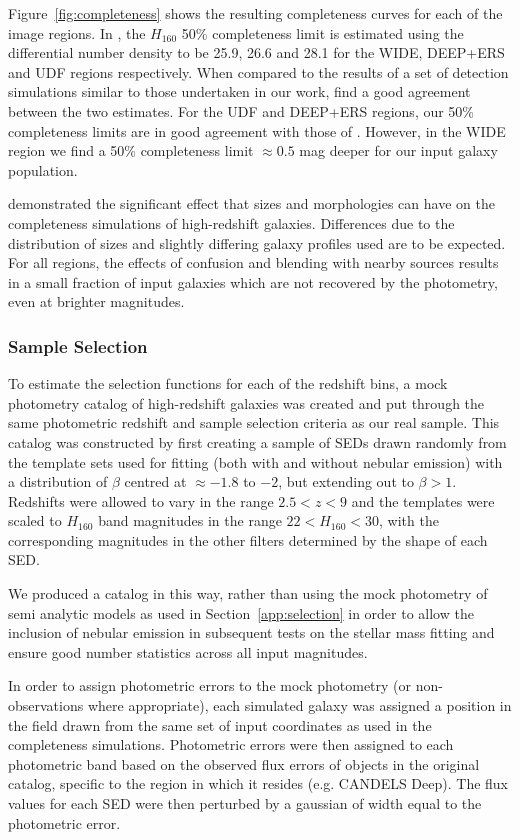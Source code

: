 Figure~\ref{fig:completeness} shows the resulting completeness curves for each of the image regions. In \citet{Guo:2013ig}, the $H_{160}$ 50\% completeness limit is estimated using the differential number density to be 25.9, 26.6 and 28.1 for the WIDE, DEEP+ERS and UDF regions respectively. When compared to the results of a set of detection simulations similar to those undertaken in our work, \citet{Guo:2013ig} find a good agreement between the two estimates. For the UDF and DEEP+ERS regions, our 50\% completeness limits are in good agreement with those of \citet{Guo:2013ig}. However, in the WIDE region we find a 50\% completeness limit $\approx 0.5$ mag deeper for our input galaxy population.

\citet{2011A&A...532A..33G} demonstrated the significant effect that sizes and morphologies can have on the completeness simulations of high-redshift galaxies. Differences due to the distribution of sizes and slightly differing galaxy profiles used are to be expected. For all regions, the effects of confusion and blending with nearby sources results in a small fraction of input galaxies which are not recovered by the photometry, even at brighter magnitudes.

\subsubsection{Sample Selection}\label{sec:selection_sims}
To estimate the selection functions for each of the redshift bins, a mock photometry catalog of high-redshift galaxies was created and put through the same photometric redshift and sample selection criteria as our real sample. This catalog was constructed by first creating a sample of SEDs drawn randomly from the template sets used for fitting (both with and without nebular emission) with a distribution of $\beta$ centred at $\approx -1.8$ to $-2$, but extending out to $\beta > 1$. Redshifts were allowed to vary in the range $2.5 < z < 9$ and the templates were scaled to $H_{160}$ band magnitudes in the range $22 < H_{160} < 30$, with the corresponding magnitudes in the other filters determined by the shape of each SED.

We produced a catalog in this way, rather than using the mock photometry of semi analytic models as used in Section~\ref{app:selection} in order to allow the inclusion of nebular emission in subsequent tests on the stellar mass fitting and ensure good number statistics across all input magnitudes. 

In order to assign photometric errors to the mock photometry (or non-observations where appropriate), each simulated galaxy was assigned a position in the field drawn from the same set of input coordinates as used in the completeness simulations. Photometric errors were then assigned to each photometric band based on the observed flux errors of objects in the original catalog, specific to the region in which it resides (e.g. CANDELS Deep). The flux values for each SED were then perturbed by a gaussian of width equal to the photometric error.

